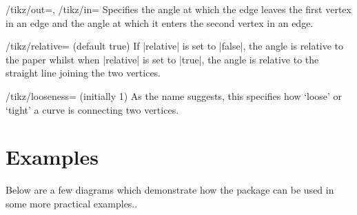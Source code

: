 \documentclass[a4paper,final]{ltxdoc}
\begin{document}
\begin{keylist}{%
  /tikz/out=,
  /tikz/in=}
  Specifies the angle at which the edge leaves the first vertex in an edge and
  the angle at which it enters the second vertex in an edge.
\end{keylist}

\begin{key}{/tikz/relative= (default true)}
  If |relative| is set to |false|, the angle is relative to the paper whilst when
  |relative| is set to |true|, the angle is relative to the straight line
  joining the two vertices.
\end{key}

\begin{key}{/tikz/looseness= (initially 1)}
  As the name suggests, this specifies how `loose' or `tight' a curve is
  connecting two vertices.
\end{key}

\clearpage
\section{Examples}
\label{sec:examples}

Below are a few diagrams which demonstrate how the package can be used in some
more practical examples..
\end{document}
